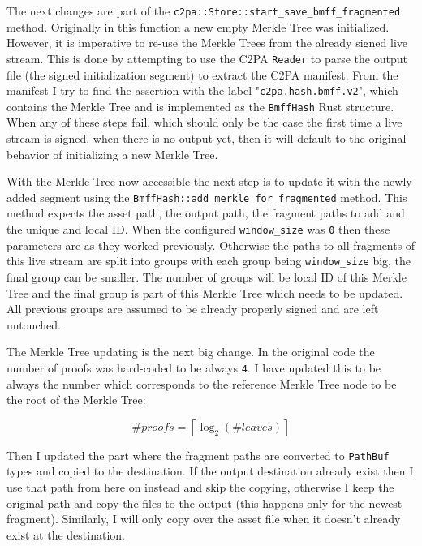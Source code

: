 The next changes are part of the \texttt{c2pa::Store::start\_save\_bmff\_fragmented} method. Originally in this function a new empty Merkle Tree was initialized. However, it is imperative to re-use the Merkle Trees from the already signed live stream. This is done by attempting to use the C2PA \texttt{Reader} to parse the output file (the signed initialization segment) to extract the C2PA manifest. From the manifest I try to find the assertion with the label "\texttt{c2pa.hash.bmff.v2}", which contains the Merkle Tree and is implemented as the \texttt{BmffHash} Rust structure. When any of these steps fail, which should only be the case the first time a live stream is signed, when there is no output yet, then it will default to the original behavior of initializing a new Merkle Tree.

With the Merkle Tree now accessible the next step is to update it with the newly added segment using the \texttt{BmffHash::add\_merkle\_for\_fragmented} method. This method expects the asset path, the output path, the fragment paths to add and the unique and local ID. When the configured \texttt{window\_size} was \texttt{0} then these parameters are as they worked previously. Otherwise the paths to all fragments of this live stream are split into groups with each group being \texttt{window\_size} big, the final group can be smaller. The number of groups will be local ID of this Merkle Tree and the final group is part of this Merkle Tree which needs to be updated. All previous groups are assumed to be already properly signed and are left untouched.

The Merkle Tree updating is the next big change. In the original code the number of proofs was hard-coded to be always \texttt{4}. I have updated this to be always the number which corresponds to the reference Merkle Tree node to be the root of the Merkle Tree:

\begin{equation}
    \#proofs = \left\lceil \log_2({\#leaves}) \right\rceil
    \label{eq:proofs}
\end{equation}

Then I updated the part where the fragment paths are converted to \texttt{PathBuf} types and copied to the destination. If the output destination already exist then I use that path from here on instead and skip the copying, otherwise I keep the original path and copy the files to the output (this happens only for the newest fragment). Similarly, I will only copy over the asset file when it doesn't already exist at the destination.

